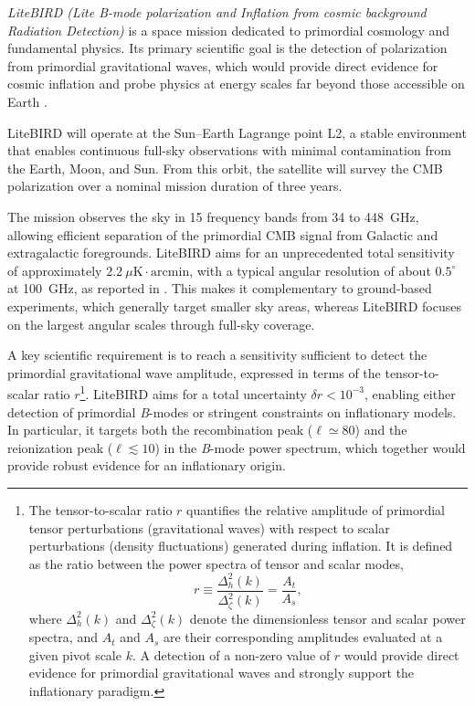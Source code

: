 \textit{LiteBIRD (Lite \textit{B}-mode polarization and Inflation from cosmic background Radiation Detection)} is a space mission dedicated to primordial cosmology and fundamental physics. Its primary scientific goal is the detection of polarization from primordial gravitational waves, which would provide direct evidence for cosmic inflation and probe physics at energy scales far beyond those accessible on Earth \cite{2022}.

LiteBIRD will operate at the Sun--Earth Lagrange point L2, a stable environment that enables continuous full-sky observations with minimal contamination from the Earth, Moon, and Sun. From this orbit, the satellite will survey the CMB polarization over a nominal mission duration of three years.

The mission observes the sky in 15 frequency bands from 34 to 448~GHz, allowing efficient separation of the primordial CMB signal from Galactic and extragalactic foregrounds. LiteBIRD aims for an unprecedented total sensitivity of approximately 
$2.2~\mu\mathrm{K \cdot arcmin}$, with a typical angular resolution of about 
$0.5^\circ$ at 100~GHz, as reported in \cite{2022}. This makes it complementary to ground-based experiments, which generally target smaller sky areas, whereas LiteBIRD focuses on the largest angular scales through full-sky coverage.

A key scientific requirement is to reach a sensitivity sufficient to detect the primordial gravitational wave amplitude, expressed in terms of the tensor-to-scalar ratio $r$\footnote{
The tensor-to-scalar ratio $r$ quantifies the relative amplitude of primordial tensor perturbations (gravitational waves) with respect to scalar perturbations (density fluctuations) generated during inflation. It is defined as the ratio between the power spectra of tensor and scalar modes,
\[
r \equiv \frac{\Delta_h^2(k)}{\Delta_\zeta^2(k)} = \frac{A_t}{A_s},
\]
where $\Delta_h^2(k)$ and $\Delta_\zeta^2(k)$ denote the dimensionless tensor and scalar power spectra, and $A_t$ and $A_s$ are their corresponding amplitudes evaluated at a given pivot scale $k$. A detection of a non-zero value of $r$ would provide direct evidence for primordial gravitational waves and strongly support the inflationary paradigm.
}. LiteBIRD aims for a total uncertainty $\delta r < 10^{-3}$, enabling either detection of primordial \textit{B}-modes or stringent constraints on inflationary models. In particular, it targets both the recombination peak ($\ell \simeq 80$) and the reionization peak ($\ell \lesssim 10$) in the \textit{B}-mode power spectrum, which together would provide robust evidence for an inflationary origin.

